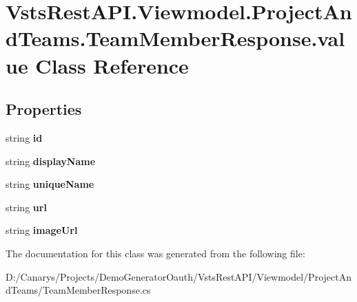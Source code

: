 \hypertarget{class_vsts_rest_a_p_i_1_1_viewmodel_1_1_project_and_teams_1_1_team_member_response_1_1value}{}\section{Vsts\+Rest\+A\+P\+I.\+Viewmodel.\+Project\+And\+Teams.\+Team\+Member\+Response.\+value Class Reference}
\label{class_vsts_rest_a_p_i_1_1_viewmodel_1_1_project_and_teams_1_1_team_member_response_1_1value}
\subsection*{Properties}
\begin{DoxyCompactItemize}
\item 
\mbox{\label{class_vsts_rest_a_p_i_1_1_viewmodel_1_1_project_and_teams_1_1_team_member_response_1_1value_aae4c285f57075decbf785b8401767e94}} 
string {\bfseries id}
\item 
\mbox{\label{class_vsts_rest_a_p_i_1_1_viewmodel_1_1_project_and_teams_1_1_team_member_response_1_1value_a9cc1b8cc03d8f9e7e14319a5936f1792}} 
string {\bfseries display\+Name}
\item 
\mbox{\label{class_vsts_rest_a_p_i_1_1_viewmodel_1_1_project_and_teams_1_1_team_member_response_1_1value_a3bff363ed90a0d556ffc51386756d07f}} 
string {\bfseries unique\+Name}
\item 
\mbox{\label{class_vsts_rest_a_p_i_1_1_viewmodel_1_1_project_and_teams_1_1_team_member_response_1_1value_adc0b57b12662ecfe25b288d67dff9433}} 
string {\bfseries url}
\item 
\mbox{\label{class_vsts_rest_a_p_i_1_1_viewmodel_1_1_project_and_teams_1_1_team_member_response_1_1value_ae6ecd8cdc92da4df5f47d7f208414f2e}} 
string {\bfseries image\+Url}
\end{DoxyCompactItemize}


The documentation for this class was generated from the following file\+:\begin{DoxyCompactItemize}
\item 
D\+:/\+Canarys/\+Projects/\+Demo\+Generator\+Oauth/\+Vsts\+Rest\+A\+P\+I/\+Viewmodel/\+Project\+And\+Teams/Team\+Member\+Response.\+cs\end{DoxyCompactItemize}
